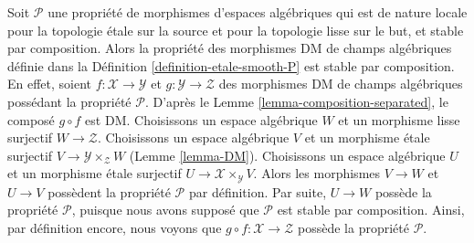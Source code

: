\begin{remark}
\label{remark-etale-smooth-composition}
Soit $\mathcal{P}$ une propriété de morphismes d'espaces algébriques
qui est de nature locale pour la topologie \'etale sur la source et pour la topologie lisse sur le but, et
stable par composition. Alors la propriété des morphismes DM de champs algébriques
définie dans la Définition \ref{definition-etale-smooth-P}
est stable par composition. En effet, soient $f : \mathcal{X} \to \mathcal{Y}$
et $g : \mathcal{Y} \to \mathcal{Z}$ des morphismes DM de champs algébriques
possédant la propriété $\mathcal{P}$. D'après le Lemme \ref{lemma-composition-separated},
le composé $g \circ f$ est DM. Choisissons un espace algébrique $W$ et un
morphisme lisse surjectif $W \to \mathcal{Z}$. Choisissons un espace algébrique
$V$ et un morphisme \'etale surjectif $V \to \mathcal{Y} \times_\mathcal{Z} W$
(Lemme \ref{lemma-DM}).
Choisissons un espace algébrique $U$ et un morphisme \'etale surjectif
$U \to \mathcal{X} \times_\mathcal{Y} V$. Alors les morphismes
$V \to W$ et $U \to V$ possèdent la propriété $\mathcal{P}$ par définition.
Par suite, $U \to W$ possède la propriété $\mathcal{P}$, puisque nous avons supposé que
$\mathcal{P}$ est stable par composition. Ainsi, par définition encore,
nous voyons que $g \circ f : \mathcal{X} \to \mathcal{Z}$ possède la
propriété $\mathcal{P}$.
\end{remark}

